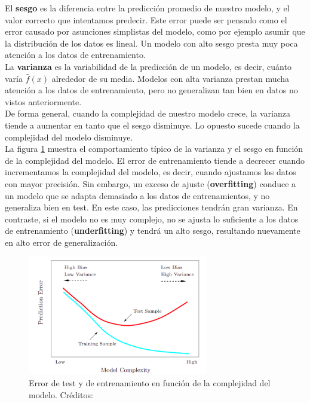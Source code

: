 El \textbf{sesgo} es la diferencia entre la predicción promedio de nuestro modelo, y el valor correcto que intentamos predecir. Este error puede ser pensado como el error causado por asunciones simplistas del modelo, como por ejemplo asumir que la distribución de los datos es lineal. Un modelo con alto sesgo presta muy poca atención a los datos de entrenamiento. \\

La \textbf{varianza} es la variabilidad de la predicción de un modelo, es decir, cuánto varía $\bar{f}(x)$ alrededor de su media. Modelos con alta varianza prestan mucha atención a los datos de entrenamiento, pero no generalizan tan bien en datos no vistos anteriormente. \\

De forma general, cuando la complejidad de nuestro modelo crece, la varianza tiende a aumentar en tanto que el sesgo disminuye. Lo opuesto sucede cuando la complejidad del modelo disminuye. \\

La figura \ref{fig:tradeoff} muestra el comportamiento típico de la varianza y el sesgo en función de la complejidad del modelo. El error de entrenamiento tiende a decrecer cuando incrementamos la complejidad del modelo, es decir, cuando ajustamos los datos con mayor precisión. Sin embargo, un exceso de ajuste (\textbf{overfitting}) conduce a un modelo que se adapta demasiado a los datos de entrenamientos, y no generaliza bien en test. En este caso, las predicciones tendrán gran varianza. En contraste, si el modelo no es muy complejo, no se ajusta lo suficiente a los datos de entrenamiento (\textbf{underfitting}) y tendrá un alto sesgo, resultando nuevamente en alto error de generalización.\\ 

\begin{figure}[h!]
\begin{center}
  \includegraphics[width=0.7\textwidth]{Kap1/tradeoff.png} 
  \end{center}
 \caption{ Error de test y de entrenamiento en función de la complejidad del modelo. Créditos: \protect\cite{statisticallearning} }
\label{fig:tradeoff}
\end{figure}


